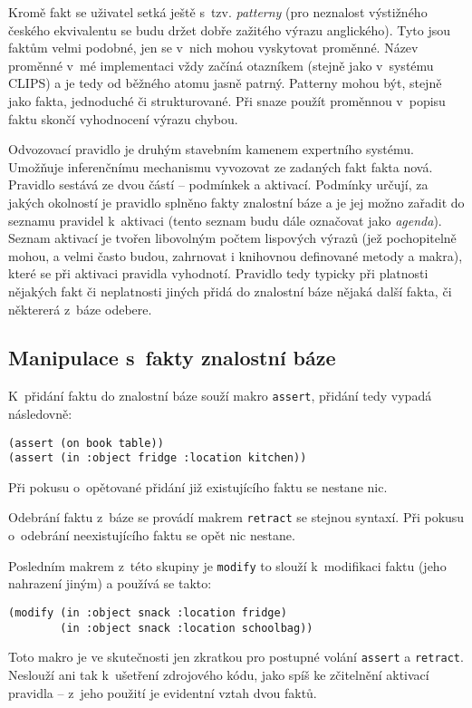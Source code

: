Kromě fakt se uživatel setká ještě s~tzv. \emph{patterny} (pro neznalost
výstižného českého ekvivalentu se budu držet dobře zažitého výrazu anglického).
Tyto jsou faktům velmi podobné, jen se v~nich mohou vyskytovat proměnné.
Název proměnné v~mé implementaci vždy začíná otazníkem (stejně jako v~systému
CLIPS) a je tedy od běžného atomu jasně patrný. Patterny mohou být, stejně
jako fakta, jednoduché či strukturované. Při snaze použít proměnnou v~popisu
faktu skončí vyhodnocení výrazu chybou.

Odvozovací pravidlo je druhým stavebním kamenem expertního systému. Umožňuje
inferenčnímu mechanismu vyvozovat ze zadaných fakt fakta nová. Pravidlo sestává
ze dvou částí -- podmínkek a aktivací. Podmínky určují, za jakých okolností je 
pravidlo splněno fakty znalostní báze a je jej možno zařadit do seznamu pravidel
k~aktivaci (tento seznam budu dále označovat jako \emph{agenda}). Seznam
aktivací je tvořen libovolným počtem lispových výrazů (jež pochopitelně mohou,
a velmi často budou, zahrnovat i knihovnou definované metody a makra), které se
při aktivaci pravidla vyhodnotí. Pravidlo tedy typicky při platnosti nějakých
fakt či neplatnosti jiných přidá do znalostní báze nějaká další fakta, či
některerá z~báze odebere.
\subsection{Manipulace s~fakty znalostní báze}
K~přidání faktu do znalostní báze souží makro \verb|assert|, přidání tedy
vypadá následovně:
\begin{verbatim}
(assert (on book table))
(assert (in :object fridge :location kitchen))
\end{verbatim}
Při pokusu o~opětované přidání již existujícího faktu se nestane nic.

Odebrání faktu z~báze se provádí makrem \verb|retract| se stejnou syntaxí.
Při pokusu o~odebrání neexistujícího faktu se opět nic nestane.

Posledním makrem z~této skupiny je \verb|modify| to slouží k~modifikaci
faktu (jeho nahrazení jiným) a používá se takto:
\begin{verbatim}
(modify (in :object snack :location fridge)
        (in :object snack :location schoolbag))
\end{verbatim}
Toto makro je ve skutečnosti jen zkratkou pro postupné volání \verb|assert|
a \verb|retract|. Neslouží ani tak k~ušetření zdrojového kódu, jako spíš
ke zčitelnění aktivací pravidla -- z~jeho použití je evidentní vztah dvou
faktů.


